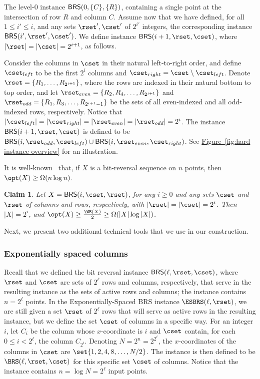\documentclass[11pt]{article}
\numberwithin{equation}{section}
\newtheorem{claim}[theorem]{Claim}
\theoremstyle{definition}
\theoremstyle{plain}
\newcommand{\expref}[2]{\hyperref[#2]{#1~\ref{#2}}}
\begin{document}
The level-$0$  instance ${\sf BRS}(0,\{C\}, \{R\})$, containing a single point at the intersection of row $R$ and column $C$. 
Assume now that we have defined, for all $1\leq i'\leq i$, and any sets $\rset',\cset'$ of $2^{i'}$ integers, the corresponding instance ${\sf BRS}(i',\rset',\cset')$. We define  instance ${\sf BRS}(i+1,\rset,\cset)$, where $|\rset| = |\cset| = 2^{i+1}$, as follows. 

Consider the columns in $\cset$ in their natural left-to-right order, and define $\cset_{left}$ to be the first $2^i$ columns and $\cset_{right} = \cset \setminus \cset_{left}$. 
Denote $\rset= \{R_1,\ldots, R_{2^{i+1}}\}$, where the rows are indexed in their natural bottom to top order, and let $\rset_{even}=\{R_2,R_4,\ldots, R_{2^{i+1}}\}$ and $\rset_{odd}=\{R_1,R_3,\ldots, R_{2^{i+1}-1}\}$ be the sets of all even-indexed and all odd-indexed rows, respectively.
Notice that $|\cset_{left}| = |\cset_{right}| = |\rset_{even}| = |\rset_{odd}| = 2^i$. 
The instance ${\sf BRS}(i+1, \rset,\cset)$ is defined to be ${\sf BRS}(i,\rset_{odd},\cset_{left}) \cup {\sf BRS}(i,\rset_{even}, \cset_{right})$. 
See \expref{Figure}{fig:hard instance overview} for an illustration. 

%




It is well-known~\cite{wilber} that, if $X$ is a bit-reversal sequence on $n$ points, then $\opt(X)\geq \Omega(n \log n)$. 

\begin{claim}
\label{claim:BRS complexity} 
Let $X= {\sf BRS}(i,\cset,\rset)$, for any $i\geq 0$ and any sets $\cset$ and $\rset$ of columns and rows, respectively, with $|\rset|=|\cset|=2^i$. Then $|X| = 2^i$, and $\opt(X) \geq \frac{\WB(X)}{2} \geq \Omega(|X| \log |X|)$.  
\end{claim} 



%
%
%
%
%
%
%
%
%
Next, we present two additional technical tools that we use in our construction. 
 

\subsubsection{Exponentially spaced columns}


Recall that we defined the bit reversal instance ${\sf BRS}(\ell, \rset, \cset)$, where $\rset$ and $\cset$ are sets of $2^{\ell}$ rows and columns, respectively, that serve in the resulting instance as the sets of active rows and columns; the instance contains $n=2^{\ell}$ points. 
In the Exponentially-Spaced BRS instance $\ESBRS(\ell,\rset)$, we are still given a set $\rset$ of $2^{\ell}$ rows that will serve as active rows in the resulting instance, but we define the set $\cset$ of columns in a specific way. For an integer $i$, let $C_i$ be the column whose $x$-coordinate is $i$ and $\cset$ contain, for each $0\leq  i< 2^{\ell}$, the column $C_{2^i}$. Denoting $N=2^n=2^{2^{\ell}}$, the $x$-coordinates of the columns in $\cset$ are $\set{1,2,4,8,\ldots,N/2}$. 
The instance is then defined to be $\BRS(\ell,\rset,\cset)$ for this specific set $\cset$ of columns.
Notice that the instance contains $n= \log N=  2^{\ell}$ input points.  
\end{document}
